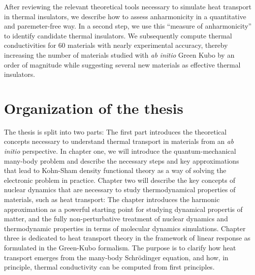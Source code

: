  After reviewing the relevant theoretical tools necessary to simulate heat transport in thermal insulators, we describe how to assess anharmonicity in a quantitative and paremeter-free way. 
In a second step, we use this ``measure of anharmonicity'' to identify candidate thermal insulators. We subsequently compute thermal conductivities for 60 materials with nearly experimental accuracy, thereby increasing the number of materials studied with \emph{ab initio} Green Kubo by an order of magnitude while suggesting several new materials as effective thermal insulators. 


\section*{Organization of the thesis}
The thesis is split into two parts: The first part introduces the theoretical concepts necessary to understand thermal transport in materials from an \emph{ab initio} perspective.
In chapter one, we will introduce the quantum-mechanical many-body problem and describe the necessary steps and key approximations that lead to Kohn-Sham density functional theory as a way of solving the electronic problem in practice. Chapter two will describe the key concepts of nuclear dynamics that are necessary to study thermodynamical properties of materials, such as heat transport: The chapter introduces the harmonic approximation as a powerful starting point for studying dynamical propertis of matter, and the fully non-perturbative treatment of nuclear dynamics and thermodynamic properties in terms of molecular dynamics simulations. Chapter three is dedicated to heat transport theory in the framework of linear response as formulated in the Green-Kubo formalism. The purpose is to clarify how heat transport emerges from the many-body Schr\"odinger equation, and how, in principle, thermal conductivity can be computed from first principles.

